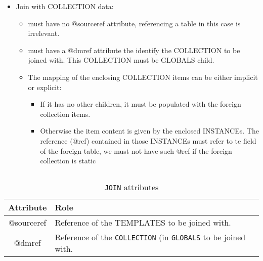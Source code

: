 \begin{itemize}
       
  \item Join with COLLECTION data:
       \begin{itemize}
         \item must have no @sourceref  attribute, referencing a table in this case is irrelevant.
         \item must have a @dmref attribute the identify the COLLECTION to be joined with. This COLLECTION must be GLOBALS child.
         \item The mapping of the enclosing COLLECTION items can be either implicit or explicit:
         \begin{itemize}
             \item If it has no other children, it must be populated with the foreign collection items.
             \item Otherwise the item content is given by the enclosed INSTANCEs. The reference (@ref) contained 
                      in those INSTANCEs must refer to te field of the foreign table, we must not have such @ref if the foreign 
                      collection is static
       \end{itemize}
  \end{itemize}
           
\end{itemize}

\begin{lstlisting}[frame=single,caption={\texttt{JOIN} },style=XML,basicstyle=\tiny]

\end{lstlisting}


\begin{table}[!htbp]
\small
\centering
\begin{tabulary}{\linewidth}{|c|J|}       
       \hline 
            \textbf{Attribute} & 
            \textbf {Role}\\
       \hline         \hline  
             @sourceref & 
            Reference of the TEMPLATES to be joined with. \\
        \hline 
            @dmref & 
            Reference of the \texttt{COLLECTION} (in \texttt{GLOBALS} to be joined with. \\
        \hline 
     \end{tabulary}
     \caption{\texttt{JOIN} attributes} 
     \label{tbl:join-att}
 \end{table}

